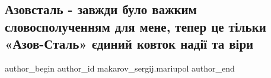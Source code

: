  
 
 
 
 

\subsection{Азовсталь - завжди було важким словосполученням для мене, тепер це тільки «Азов-Сталь» єдиний ковток надії та віри}
\label{sec:04_05_2022.fb.makarov_sergij.mariupol.1.azovstal___zavzhdi_b}

\ifcmt
 author_begin
   author_id makarov_sergij.mariupol
 author_end
\fi
